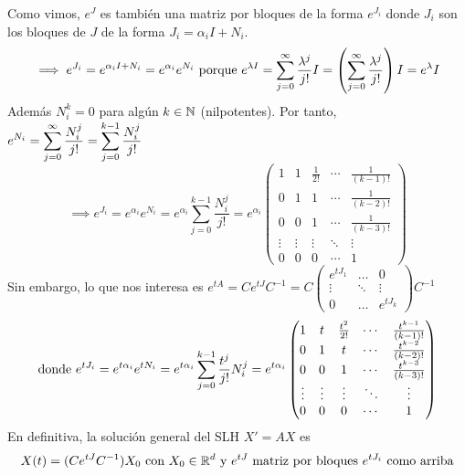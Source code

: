 Como vimos, $e^J$ es también una matriz por bloques de la forma $e^{J_i}$ donde $J_i$ son los bloques de $J$ de la forma $J_i = \alpha_i I + N_i$.
\[\implies e^{J_i} = e^{\alpha_i I + N_i} = e^{\alpha_i} e^{N_i} \text{ porque } e^{\lambda I} = \sum_{j=0}^{\infty} \frac{\lambda^j}{j!} I = \left(\sum_{j=0}^{\infty} \frac{\lambda^j}{j!}\right) I = e^{\lambda} I\]
Además $N_i^k = 0$ para algún $k \in \mathbb{N}$ (nilpotentes). Por tanto, $\displaystyle e^{N_i} = \sum_{j=0}^{\infty} \frac{N_i^j}{j!} = \sum_{j=0}^{k-1} \frac{N_i^j}{j!}$
\[\implies e^{J_i} = e^{\alpha_i} e^{N_i} = e^{\alpha_i} \sum_{j=0}^{k-1} \frac{N_i^j}{j!} = e^{\alpha_i} \begin{pmatrix}
		1      & 1      & \frac{1}{2!} & \cdots & \frac{1}{(k-1)!} \\
		0      & 1      & 1            & \cdots & \frac{1}{(k-2)!} \\
		0      & 0      & 1            & \cdots & \frac{1}{(k-3)!} \\
		\vdots & \vdots & \vdots       & \ddots & \vdots           \\
		0      & 0      & 0            & \cdots & 1
	\end{pmatrix}\]
Sin embargo, lo que nos interesa es $e^{tA} = Ce^{tJ}C^{-1} = C \begin{pmatrix}
		e^{t J_1} & \dots  & 0         \\
		\vdots    & \ddots & \vdots    \\
		0         & \dots  & e^{t J_k}
	\end{pmatrix} C^{-1}$
\[\text{donde }e^{t J_i} = e^{t\alpha_i}e^{tN_i} = e^{t\alpha_i} \sum_{j=0}^{k-1} \frac{t^j}{j!} N_i^j = e^{t\alpha_i} \begin{pmatrix}
		1      & t      & \frac{t^2}{2!} & \cdots & \frac{t^{k-1}}{(k-1)!} \\
		0      & 1      & t              & \cdots & \frac{t^{k-2}}{(k-2)!} \\
		0      & 0      & 1              & \cdots & \frac{t^{k-3}}{(k-3)!} \\
		\vdots & \vdots & \vdots         & \ddots & \vdots                 \\
		0      & 0      & 0              & \cdots & 1
	\end{pmatrix}\]
En definitiva, la solución general del SLH $X' = AX$ es
\[X(t) = (Ce^{tJ}C^{-1})X_0 \text{ con } X_0 \in \mathbb{R}^d \text{ y } e^{tJ} \text{ matriz por bloques } e^{tJ_i} \text{ como arriba}\]

